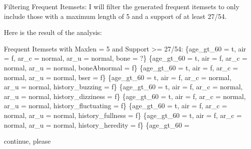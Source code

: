 \documentclass[12pt]{article}
\begin{document}
\begin{mdframed}
    Filtering Frequent Itemsets: I will filter the generated frequent itemsets to only include those with a maximum length of 5 and a support of at least 27/54.
\newline

Here is the result of the analysis:
\newline

    Frequent Itemsets with Maxlen = 5 and Support >= 27/54:
        \{age\_gt\_60 = t, air = f, ar\_c = normal, ar\_u = normal, bone = ?\}
        \{age\_gt\_60 = t, air = f, ar\_c = normal, ar\_u = normal, boneAbnormal = f\}
        \{age\_gt\_60 = t, air = f, ar\_c = normal, ar\_u = normal, bser = f\}
        \{age\_gt\_60 = t, air = f, ar\_c = normal, ar\_u = normal, history\_buzzing = f\}
        \{age\_gt\_60 = t, air = f, ar\_c = normal, ar\_u = normal, history\_dizziness = f\}
        \{age\_gt\_60 = t, air = f, ar\_c = normal, ar\_u = normal, history\_fluctuating = f\}
        \{age\_gt\_60 = t, air = f, ar\_c = normal, ar\_u = normal, history\_fullness = f\}
        \{age\_gt\_60 = t, air = f, ar\_c = normal, ar\_u = normal, history\_heredity = f\}
        \{age\_gt\_60 =
\end{mdframed}

continue, please
\end{document}
